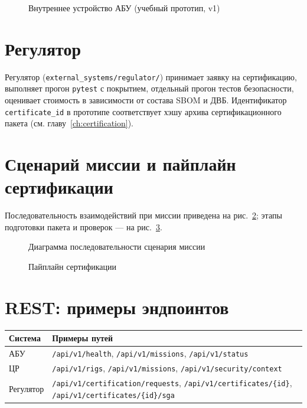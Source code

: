\begin{figure}[htbp]
  \centering
  \caption{Внутреннее устройство АБУ (учебный прототип, v1)}
  \label{fig:abu-internal}
\end{figure}

\section{Регулятор}

Регулятор (\texttt{external\_systems/regulator/}) принимает заявку на сертификацию, выполняет прогон \texttt{pytest} с покрытием, отдельный прогон тестов безопасности, оценивает стоимость в зависимости от состава SBOM и ДВБ. Идентификатор \texttt{certificate\_id} в прототипе соответствует хэшу архива сертификационного пакета (см. главу~\ref{ch:certification}).

\section{Сценарий миссии и пайплайн сертификации}

Последовательность взаимодействий при миссии приведена на рис.~\ref{fig:sequence}; этапы подготовки пакета и проверок --- на рис.~\ref{fig:cert-pipe}.

\begin{figure}[htbp]
  \centering
  \caption{Диаграмма последовательности сценария миссии}
  \label{fig:sequence}
\end{figure}

\begin{figure}[htbp]
  \centering
  \caption{Пайплайн сертификации}
  \label{fig:cert-pipe}
\end{figure}

\section{REST: примеры эндпоинтов}

\begin{tabularx}{\textwidth}{@{}l X@{}}
\toprule
\textbf{Система} & \textbf{Примеры путей} \\
\midrule
АБУ & \texttt{/api/v1/health}, \texttt{/api/v1/missions}, \texttt{/api/v1/status} \\
ЦР & \texttt{/api/v1/rigs}, \texttt{/api/v1/missions}, \texttt{/api/v1/security/context} \\
Регулятор & \texttt{/api/v1/certification/requests}, \texttt{/api/v1/certificates/\{id\}}, \texttt{/api/v1/certificates/\{id\}/sga} \\
\bottomrule
\end{tabularx}

